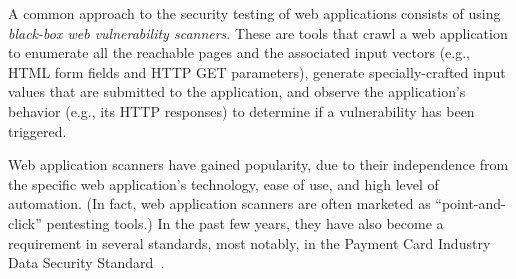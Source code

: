 
%


A common approach to the security testing of web applications consists
of using {\em black-box web vulnerability scanners}.
These are tools that
crawl a web
application to enumerate all the reachable pages and the associated input vectors
(e.g., HTML form fields and HTTP GET parameters), generate specially-crafted input
values that are submitted to the application, and observe the
application's behavior (e.g., its HTTP responses) to determine if a
vulnerability has been triggered.

Web application scanners have gained popularity, due to
their independence from the specific web application's technology, ease of
use, and high level of automation. (In fact, web application scanners
are often marketed as ``point-and-click'' pentesting tools.) In the past
few years, they have also become a requirement in several standards,
most notably, in the Payment Card Industry Data Security
Standard~\cite{pci}.

